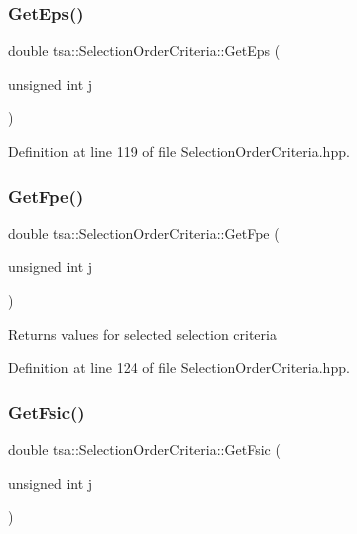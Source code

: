 \subsubsection{\texorpdfstring{Get\+Eps()}{GetEps()}}
{\footnotesize\ttfamily double tsa\+::\+Selection\+Order\+Criteria\+::\+Get\+Eps (\begin{DoxyParamCaption}\item[{unsigned int}]{j }\end{DoxyParamCaption})\hspace{0.3cm}{\ttfamily [inline]}}



Definition at line 119 of file Selection\+Order\+Criteria.\+hpp.

\mbox{\label{classtsa_1_1_selection_order_criteria_a576439d71bf4a7e567c540c4f1eabf40}} 
\subsubsection{\texorpdfstring{Get\+Fpe()}{GetFpe()}}
{\footnotesize\ttfamily double tsa\+::\+Selection\+Order\+Criteria\+::\+Get\+Fpe (\begin{DoxyParamCaption}\item[{unsigned int}]{j }\end{DoxyParamCaption})\hspace{0.3cm}{\ttfamily [inline]}}

\begin{DoxyReturn}{Returns}
values for selected selection criteria 
\end{DoxyReturn}


Definition at line 124 of file Selection\+Order\+Criteria.\+hpp.

\mbox{\label{classtsa_1_1_selection_order_criteria_a6cd4473ff39d1ef44384cbd3dd2ee9c6}} 
\subsubsection{\texorpdfstring{Get\+Fsic()}{GetFsic()}}
{\footnotesize\ttfamily double tsa\+::\+Selection\+Order\+Criteria\+::\+Get\+Fsic (\begin{DoxyParamCaption}\item[{unsigned int}]{j }\end{DoxyParamCaption})\hspace{0.3cm}{\ttfamily [inline]}}

